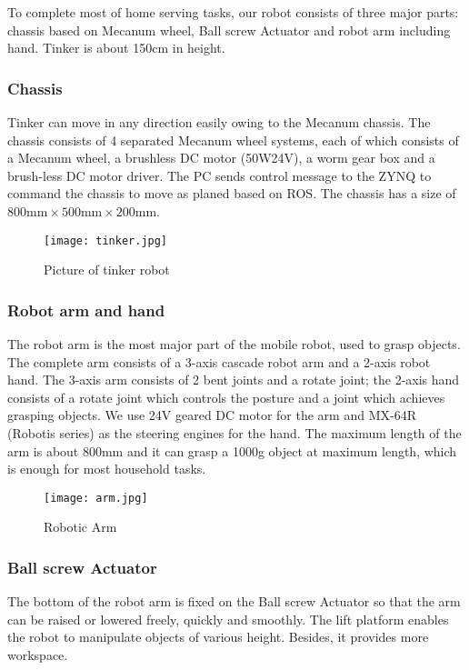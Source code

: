 To complete most of home serving tasks, our robot consists of three major parts: chassis based on Mecanum wheel, Ball screw Actuator and robot arm including hand. Tinker is about 150cm in height. 
\subsubsection{Chassis}
Tinker can move in any direction easily owing to the Mecanum chassis. The chassis consists of 4 separated Mecanum wheel systems, each of which consists of a Mecanum wheel, a brushless DC motor (50W24V), a worm gear box and a brush-less DC motor driver. The PC sends control message to the ZYNQ to command the chassis to move as planed based on ROS. The chassis has a size of $800\text{mm} \times 500\text{mm}\times 200\text{mm}$.
\begin{figure}[!t]
\centering
\texttt{[image: tinker.jpg]}
    \caption{Picture of tinker robot}
\end{figure}

\subsubsection{Robot arm and hand}
The robot arm is the most major part of the mobile robot, used to grasp objects. The complete arm consists of a 3-axis cascade robot arm and a 2-axis robot hand. The 3-axis arm consists of 2 bent joints and a rotate joint; the 2-axis hand consists of a rotate joint which controls the posture and a joint which achieves grasping objects. We use 24V geared DC motor for the arm and MX-64R (Robotis series) as the steering engines for the hand. The maximum length of the arm is about 800mm and it can grasp a 1000g object at maximum length, which is enough for most household tasks. 
\begin{figure*}[!t]
	\centering
    \texttt{[image: arm.jpg]}
    \caption{Robotic Arm}
\end{figure*}

\subsubsection{Ball screw Actuator}
The bottom of the robot arm is fixed on the Ball screw Actuator so that the arm can be raised or lowered freely, quickly and smoothly. The lift platform enables the robot to manipulate objects of various height. Besides, it provides more workspace.


